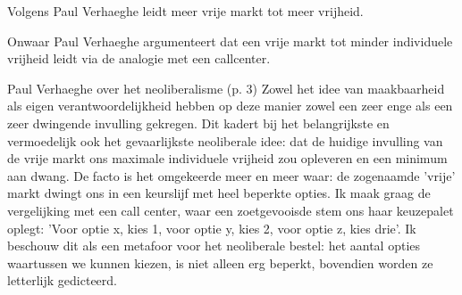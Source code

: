 \documentclass[main.tex]{subfiles}
\begin{document}
\begin{examenvraag}
    \begin{stelling}
        Volgens Paul Verhaeghe leidt meer vrije markt tot meer vrijheid.
    \end{stelling}

    \begin{stelling-antwoord}{Onwaar}
        Paul Verhaeghe argumenteert dat een vrije markt tot minder individuele vrijheid leidt via de analogie met een callcenter.
        \begin{citaat}{Paul Verhaeghe over het neoliberalisme (p. 3)}
            Zowel het idee van maakbaarheid als eigen verantwoordelijkheid hebben op deze manier zowel een zeer enge als een zeer dwingende invulling gekregen.
            Dit kadert bij het belangrijkste en vermoedelijk ook het gevaarlijkste neoliberale idee: dat de huidige invulling van de vrije markt ons maximale individuele vrijheid zou opleveren en een minimum aan dwang.
            De facto is het omgekeerde meer en meer waar: de zogenaamde 'vrije' markt dwingt ons in een keurslijf met heel beperkte opties.
            Ik maak graag de vergelijking met een call center, waar een zoetgevooisde stem ons haar keuzepalet oplegt: 'Voor optie x, kies 1, voor optie y, kies 2, voor optie z, kies drie'.
            Ik beschouw dit als een metafoor voor het neoliberale bestel: het aantal opties waartussen we kunnen kiezen, is niet alleen erg beperkt, bovendien worden ze letterlijk gedicteerd.
        \end{citaat}
    \end{stelling-antwoord}
\end{examenvraag}
\end{document}
